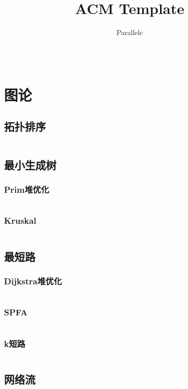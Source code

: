 \documentclass[a4paper,6pt]{article}
\author{Parallelc}
\title{ACM Template}
\begin{document}
 
\begin{titlepage}
\maketitle
\thispagestyle{empty}
\vspace*{100pt}
\inputminted[breaklines]{c++}{other/vim.txt}
\end{titlepage}

\newpage
\tableofcontents

\newpage
\section{图论}
\subsection{拓扑排序}
\inputminted[breaklines]{c++}{graph-theory/topsort.cpp}
\subsection{最小生成树}
\subsubsection{Prim堆优化}
\inputminted[breaklines]{c++}{graph-theory/MST/Prim+heap.cpp}
\subsubsection{Kruskal}
\inputminted[breaklines]{c++}{graph-theory/MST/Kruskal.cpp}
\subsection{最短路}
\subsubsection{Dijkstra堆优化}
\inputminted[breaklines]{c++}{graph-theory/short-path/Dijkstra+heap.cpp}
\subsubsection{SPFA}
\inputminted[breaklines]{c++}{graph-theory/short-path/spfa.cpp}
\subsubsection{k短路}
\inputminted[breaklines]{c++}{graph-theory/short-path/k-short.cpp}
\subsection{网络流}
\end{document}
